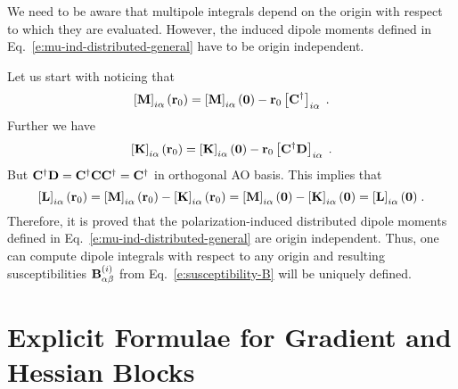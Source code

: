 \documentclass[aip,graphicx]{revtex4-1}
\begin{document}
We need to be aware that multipole integrals depend on the origin with respect to which they are evaluated.
However, the induced dipole moments defined in Eq.~\eqref{e:mu-ind-distributed-general} 
have to be origin independent. 

Let us start with noticing that
%
\begin{equation}
 \left[ {\bf M} \right]_{i\alpha} ({\bf r}_0) 
 = \left[ {\bf M} \right]_{i\alpha} ({\bf 0}) - {\bf r}_0 \left[ {\bf C}^\dagger \right]_{i\alpha}  \;.
\end{equation}
%
Further we have
%
\begin{equation}
 \left[ {\bf K} \right]_{i\alpha} ({\bf r}_0) 
 = \left[ {\bf K} \right]_{i\alpha} ({\bf 0}) - {\bf r}_0 \left[ {\bf C}^\dagger {\bf D} \right]_{i\alpha} \;.
\end{equation}
%
But ${\bf C}^\dagger {\bf D}={\bf C}^\dagger {\bf C} {\bf C}^\dagger={\bf C}^\dagger$ in orthogonal
AO basis. This implies that
%
\begin{equation}
   \left[ {\bf L} \right]_{i\alpha} ({\bf r}_0) 
 = \left[ {\bf M} \right]_{i\alpha} ({\bf r}_0) - \left[ {\bf K} \right]_{i\alpha} ({\bf r}_0)
 = \left[ {\bf M} \right]_{i\alpha} ({\bf 0})   - \left[ {\bf K} \right]_{i\alpha} ({\bf 0})
 = \left[ {\bf L} \right]_{i\alpha} ({\bf 0}) \;.
\end{equation}
%
Therefore, it is proved that the polarization\hyp{}induced distributed dipole moments 
defined in Eq.~\eqref{e:mu-ind-distributed-general} 
are origin independent.
Thus, one can compute dipole integrals with respect to any origin and resulting
susceptibilities ${\bf B}_{\alpha\beta}^{(i)}$ from Eq.~\eqref{e:susceptibility-B} will be uniquely defined.

\section{\label{a:blocks} Explicit Formulae for Gradient and Hessian Blocks}
\end{document}
